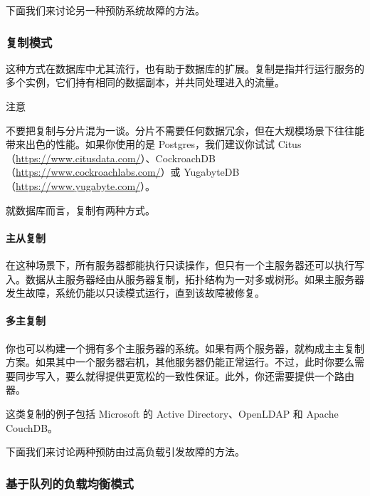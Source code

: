 下面我们来讨论另一种预防系统故障的方法。

\subsubsection{复制模式}

\label{idx:323}
\label{idx:324}
这种方式在数据库中尤其流行，也有助于数据库的扩展。复制是指并行运行服务的多个实例，它们持有相同的数据副本，并共同处理进入的流量。

\begin{myNotic}{注意}

不要把复制与分片混为一谈。分片不需要任何数据冗余，但在大规模场景下往往能带来出色的性能。如果你使用的是 Postgres，我们建议你试试 Citus（\href{https://www.citusdata.com/}{https://www.citusdata.com/}）、CockroachDB（\href{https://www.cockroachlabs.com/}{https://www.cockroachlabs.com/}）或 YugabyteDB（\href{https://www.yugabyte.com/}{https://www.yugabyte.com/}）。
\end{myNotic}

就数据库而言，复制有两种方式。

\paragraph{主从复制}

\label{idx:325}
在这种场景下，所有服务器都能执行只读操作，但只有一个主服务器还可以执行写入。数据从主服务器经由从服务器复制，拓扑结构为一对多或树形。如果主服务器发生故障，系统仍能以只读模式运行，直到该故障被修复。


\paragraph{多主复制}

\label{idx:326}
你也可以构建一个拥有多个主服务器的系统。如果有两个服务器，就构成主主复制方案。如果其中一个服务器宕机，其他服务器仍能正常运行。不过，此时你要么需要同步写入，要么就得提供更宽松的一致性保证。此外，你还需要提供一个路由器。


\label{idx:327}
这类复制的例子包括 Microsoft 的 Active Directory、OpenLDAP 和 Apache CouchDB。

下面我们来讨论两种预防由过高负载引发故障的方法。

\subsubsection{基于队列的负载均衡模式}

